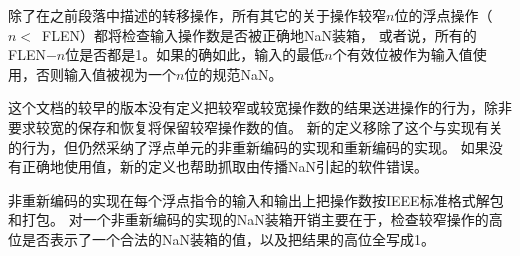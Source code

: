 除了在之前段落中描述的转移操作，所有其它的关于操作较窄$n$位的浮点操作（\mbox{$n<$ FLEN}）都将检查输入操作数是否被正确地NaN装箱，
或者说，所有的FLEN$-n$位是否都是1。如果的确如此，输入的最低$n$个有效位被作为输入值使用，否则输入值被视为一个$n$位的规范NaN。

\begin{commentary}
  这个文档的较早的版本没有定义把较窄或较宽操作数的结果送进操作的行为，除非要求较宽的保存和恢复将保留较窄操作数的值。
  新的定义移除了这个与实现有关的行为，但仍然采纳了浮点单元的非重新编码的实现和重新编码的实现。
  如果没有正确地使用值，新的定义也帮助抓取由传播NaN引起的软件错误。

非重新编码的实现在每个浮点指令的输入和输出上把操作数按IEEE标准格式解包和打包。
对一个非重新编码的实现的NaN装箱开销主要在于，检查较窄操作的高位是否表示了一个合法的NaN装箱的值，以及把结果的高位全写成1。


\end{commentary}
